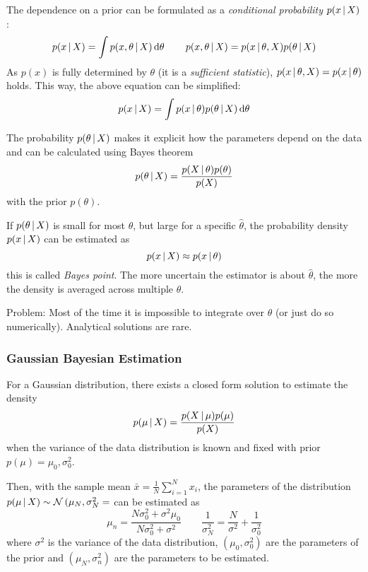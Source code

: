 			The dependence on a prior can be formulated as a \emph{conditional probability} \( p(x \,\vert\, X) \):
			\begin{equation}
				p(x \,\vert\, X) = \int p(x, \theta \,\vert\, X) \dd{\theta} \qquad p(x, \theta \,\vert\, X) = p(x \,\vert\, \theta, X) p(\theta \,\vert\, X)
			\end{equation}
			As \( p(x) \) is fully determined by \(\theta\) (it is a \emph{sufficient statistic}), \( p(x \,\vert\, \theta, X) = p(x \,\vert\, \theta) \) holds. This way, the above equation can be simplified:
			\begin{equation}
				p(x \,\vert\, X) = \int p(x \,\vert\, \theta) p(\theta \,\vert\, X) \dd{\theta}
			\end{equation}

			The probability \( p(\theta \,\vert\, X) \) makes it explicit how the parameters depend on the data and can be calculated using Bayes theorem
			\begin{equation}
				p(\theta \,\vert\, X) = \frac{p(X \,\vert\, \theta) p(\theta)}{p(X)}
			\end{equation}
			with the prior \( p(\theta) \).

			If \( p(\theta \,\vert\, X) \) is small for most \(\theta\), but large for a specific \( \hat{\theta} \), the probability density \( p(x \,\vert\, X) \) can be estimated as
			\begin{equation}
				p(x \,\vert\, X) \approx p(x \,\vert\, \theta)
			\end{equation}
			this is called \emph{Bayes point}. The more uncertain the estimator is about \( \hat{\theta} \), the more the density is averaged across multiple \(\theta\).

			Problem: Most of the time it is impossible to integrate over \(\theta\) (or just do so numerically). Analytical solutions are rare.

			\subsubsection{Gaussian Bayesian Estimation}
				For a Gaussian distribution, there exists a closed form solution to estimate the density
				\begin{equation}
					p(\mu \,\vert\, X) = \frac{p(X \,\vert\, \mu) p(\mu)}{p(X)}
				\end{equation}
				when the variance of the data distribution is known and fixed with prior \( p(\mu) = \mathcal{\mu_0, \sigma_0^2} \).

				Then, with the sample mean \( \bar{x} = \frac{1}{N} \sum_{i = 1}^{N} x_i \), the parameters of the distribution \( p(\mu \,\vert\, X) \sim \mathcal{N}\,(\mu_N, \sigma_N^2= \) can be estimated as
				\begin{equation}
					\mu_n = \frac{N\sigma_0^2 + \sigma^2 \mu_0}{N\sigma_0^2 + \sigma^2} \qquad \frac{1}{\sigma_N^2} = \frac{N}{\sigma^2} + \frac{1}{\sigma_0^2}
				\end{equation}
				where \(\sigma^2\) is the variance of the data distribution, \( (\mu_0, \sigma_0^2) \) are the parameters of the prior and \( (\mu_N, \sigma_n^2) \) are the parameters to be estimated.

